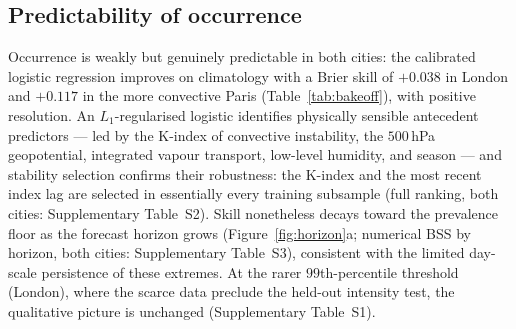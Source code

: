\documentclass[11pt,a4paper]{article}
\begin{document}
\subsection{Predictability of occurrence}\label{sec:res-occ}
Occurrence is weakly but genuinely predictable in both cities: the calibrated logistic regression improves on climatology with a Brier skill of $+0.038$ in London and
$+0.117$ in the more convective Paris (Table~\ref{tab:bakeoff}), with positive
resolution. An $L_1$-regularised logistic identifies physically sensible
antecedent predictors --- led by the {K-index} of convective instability,
the $500$\,hPa geopotential, integrated vapour transport, low-level humidity, and
season --- and stability selection confirms their robustness: the K-index and the
most recent index lag are selected in essentially every training subsample (full
ranking, both cities: Supplementary Table~S2). Skill nonetheless decays toward
the prevalence floor as the forecast horizon grows (Figure~\ref{fig:horizon}a;
numerical BSS by horizon, both cities: Supplementary Table~S3), consistent with
the limited day-scale persistence of
these extremes. At the rarer $99$th-percentile threshold (London), where the
scarce data preclude the held-out intensity test, the qualitative picture is
unchanged (Supplementary Table~S1).
\end{document}
